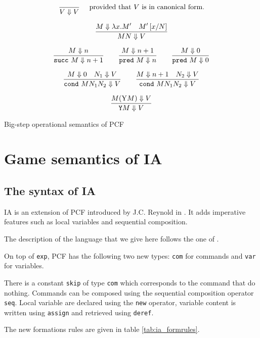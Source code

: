 \begin{table}[htbp]
$$\frac{\displaystyle }{V \Downarrow V} \quad \mbox{ provided that $V$ is in canonical form.} $$

$$ \frac{\displaystyle M \Downarrow \lambda x. M' \quad M'\left[ x/N \right]}{M N \Downarrow V}$$

$$\frac{\displaystyle M \Downarrow n}{\texttt{succ}\ M \Downarrow n+1}
\qquad \frac{\displaystyle M \Downarrow n+1}{\texttt{pred}\ M \Downarrow n}
\qquad \frac{\displaystyle M \Downarrow 0}{\texttt{pred}\ M \Downarrow 0}$$

$$\frac{\displaystyle M \Downarrow 0 \quad N_1 \Downarrow V}{\texttt{cond}\ M N_1 N_2  \Downarrow V}
\qquad
 \frac{\displaystyle M \Downarrow n+1 \quad N_2 \Downarrow V}{\texttt{cond}\ M N_1 N_2  \Downarrow V}$$

$$\frac{\displaystyle M (\mathrm{Y} M) \Downarrow V }{\texttt{Y} M \Downarrow V}$$
\label{tab:bigstep_pcf}
\caption{Big-step operational semantics of PCF}
\end{table}



\section{Game semantics of IA}
\label{sec:ia}

\subsection{The syntax of IA}
IA is an extension of PCF introduced by J.C. Reynold in
\cite{Reynolds81}. It adds imperative features such as local variables and sequential composition.

The description of the language that we give here follows the one of \cite{abramsky:game-semantics}.

On top of \texttt{exp}, PCF has the following two new types:
 \texttt{com} for commands and \texttt{var} for variables.

There is a constant \texttt{skip} of type \texttt{com} which corresponds to the command that do
nothing. Commands can be composed using the sequential composition operator \texttt{seq}.
Local variable are declared using the \texttt{new} operator, variable content is written
using \texttt{assign} and retrieved using \texttt{deref}.

The new formations rules are given in table \ref{tab:ia_formrules}.

